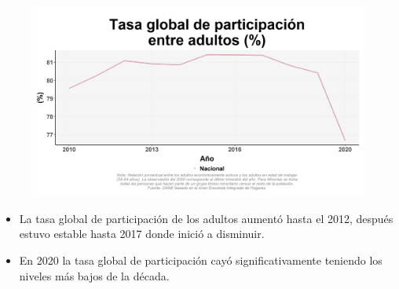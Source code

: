     \begin{figure}[H]
        \caption[Tasa global de participación de los adultos a nivel nacional ]{\label{particadu_nal_trend} }
        \begin{center}
        \includegraphics[width=\textwidth,keepaspectratio]{img/var_83_trend.png}
        \end{center}
    \end{figure}
            \begin{itemize}
                \item La tasa global de participación de los adultos aumentó hasta el 2012, después estuvo estable hasta 2017 donde inició a disminuir.
                \item En 2020 la tasa global de participación cayó significativamente teniendo los niveles más bajos de la década.
                \end{itemize}

